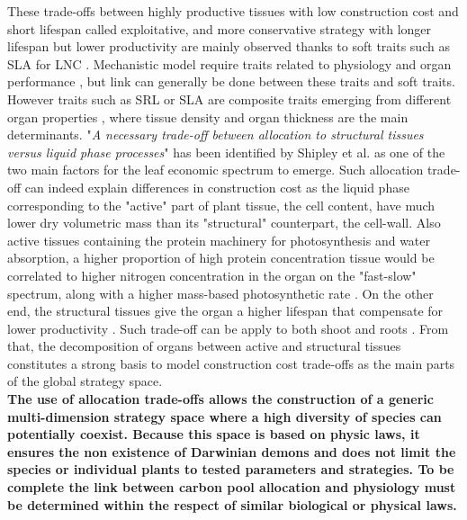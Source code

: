 These trade-offs between highly productive tissues with low construction cost and short lifespan called exploitative, and more conservative strategy with longer lifespan but lower productivity are mainly observed thanks to soft traits such as SLA for LNC \cite{wright_worldwide_2004}. Mechanistic model require traits related to physiology and organ performance \cite{soussana_gemini:_2012, lohier_explaining_2014}, but link can generally be done between these traits and soft traits. However traits such as SRL or SLA are composite traits emerging from different organ properties \cite{ryser_importance_1996,john_anatomical_2017}, where tissue density and organ thickness are the main determinants. "\textit{A necessary trade-off between allocation to structural tissues versus liquid phase processes}" has been identified by Shipley et al. \cite{shipley_fundamental_2006} as one of the two main factors for the leaf economic spectrum to emerge. Such allocation trade-off can indeed explain differences in construction cost as the liquid phase corresponding to the "active" part of plant tissue, the cell content, have much lower dry volumetric mass than its "structural" counterpart, the cell-wall. Also active tissues containing the protein machinery for photosynthesis and water absorption, a higher proportion of high protein concentration tissue would be correlated to higher nitrogen concentration in the organ on the "fast-slow" spectrum, along with a higher mass-based photosynthetic rate \cite{reich_world-wide_2014}. On the other end, the structural tissues give the organ a higher lifespan \cite{mediavilla_internal_2001, ryser_importance_1996} that compensate for lower productivity \cite{westoby_time_2000}. Such trade-off can be apply to both shoot and roots \cite{craine_functional_2002, tjoelker_linking_2005, reich_world-wide_2014}. From that, the decomposition of organs between active and structural tissues constitutes a strong basis to model construction cost trade-offs as the main parts of the global strategy space.\\


\textbf{The use of allocation trade-offs allows the construction of a generic multi-dimension strategy space where a high diversity of species can potentially coexist. Because this space is based on physic laws, it ensures the non existence of Darwinian demons and does not limit the species or individual plants to tested parameters and strategies. To be complete the link between carbon pool allocation and physiology must be determined within the respect of similar biological or physical laws.}

